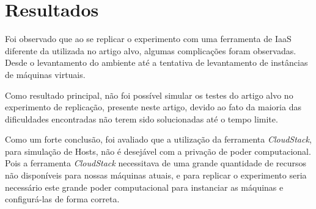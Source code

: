 \section{Resultados}
\label{sec:resultados}

Foi observado que ao se replicar o experimento com uma ferramenta de IaaS diferente da utilizada no artigo alvo, algumas complicações foram observadas. Desde o levantamento do ambiente até a tentativa de levantamento de instâncias de máquinas virtuais.

Como resultado principal, não foi possível simular os testes do artigo alvo no experimento de replicação, presente neste artigo, devido ao fato da maioria das dificuldades encontradas não terem sido solucionadas até o tempo limite.

Como um forte conclusão, foi avaliado que a utilização da ferramenta \textit{CloudStack}, para simulação de Hosts, não é desejável com a privação de poder computacional. Pois a ferramenta \textit{CloudStack} necessitava de uma grande quantidade de recursos não disponíveis para nossas máquinas atuais, e para replicar o experimento seria necessário este grande poder computacional para instanciar as máquinas e configurá-las de forma correta.
